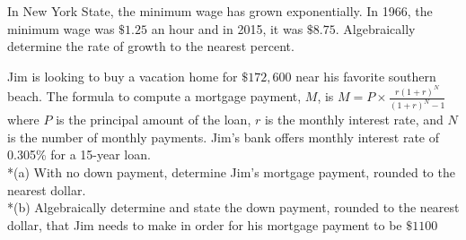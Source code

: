 \item In New York State, the minimum wage has grown exponentially. In 1966, the minimum wage was $\$1.25$ an hour and in 2015, it was $\$8.75$. Algebraically determine the rate of growth to the nearest percent.
\item Jim is looking to buy a vacation home for $\$172,600$ near his favorite southern beach. The formula to compute a mortgage payment, $M$, is $M=P \times \frac{r(1+r)^N}{(1+r)^N -1}$ where $P$ is the principal amount of the loan, $r$ is the monthly interest rate, and $N$ is the number of monthly payments. Jim's bank offers monthly interest rate of 0.305\% for a 15-year loan.\\*(a) With no down payment, determine Jim's mortgage payment, rounded to the nearest dollar.\\*(b) Algebraically determine and state the down payment, rounded to the nearest dollar, that Jim needs to make in order for his mortgage payment to be $\$1100$
